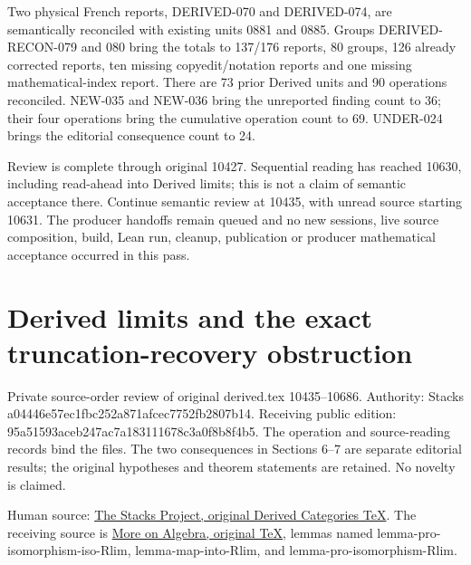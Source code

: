\documentclass[11pt]{article}
\begin{document}
Two physical French reports,\allowbreak{} DERIVED-070 and DERIVED-074,\allowbreak{} are semantically reconciled with existing units 0881 and 0885. Groups DERIVED-RECON-079 and 080 bring the totals to 137/\allowbreak{}176 reports,\allowbreak{} 80 groups,\allowbreak{} 126 already corrected reports,\allowbreak{} ten missing copyedit/\allowbreak{}notation reports and one missing mathematical-index report. There are 73 prior Derived units and 90 operations reconciled. NEW-035 and NEW-036 bring the unreported finding count to 36; their four operations bring the cumulative operation count to 69. UNDER-024 brings the editorial consequence count to 24.

Review is complete through original 10427. Sequential reading has reached 10630,\allowbreak{} including read-ahead into Derived limits; this is not a claim of semantic acceptance there. Continue semantic review at 10435,\allowbreak{} with unread source starting 10631. The producer handoffs remain queued and no new sessions,\allowbreak{} live source composition,\allowbreak{} build,\allowbreak{} Lean run,\allowbreak{} cleanup,\allowbreak{} publication or producer mathematical acceptance occurred in this pass.
\clearpage
\section{Derived limits and the exact truncation-recovery obstruction}\label{proofs-10435-10686-derived-limits-and-the-exact-truncation-recovery-obstruction}

Private source-order review of original derived.tex 10435–\allowbreak{}10686. Authority:\allowbreak{} Stacks a04446e5\allowbreak{}7ec1fbc2\allowbreak{}52a871af\allowbreak{}cec7752f\allowbreak{}b2807b14. Receiving public edition:\allowbreak{} 95a51593\allowbreak{}aceb247a\allowbreak{}c7a18311\allowbreak{}1678c3a0\allowbreak{}f8b8f4b5. The operation and source-reading records bind the files. The two consequences in Sections 6–\allowbreak{}7 are separate editorial results; the original hypotheses and theorem statements are retained. No novelty is claimed.

Human source:\allowbreak{} \href{https://github.com/stacks/stacks-project/blob/a04446e57ec1fbc252a871afcec7752fb2807b14/derived.tex\#L10435}{The Stacks Project,\allowbreak{} original Derived Categories TeX}. The receiving source is \href{https://github.com/stacks/stacks-project/blob/a04446e57ec1fbc252a871afcec7752fb2807b14/more-algebra.tex}{More on Algebra,\allowbreak{} original TeX},\allowbreak{} lemmas named lemma-pro-isomorphism-iso-Rlim,\allowbreak{} lemma-map-into-Rlim,\allowbreak{} and lemma-pro-isomorphism-Rlim.
\end{document}
